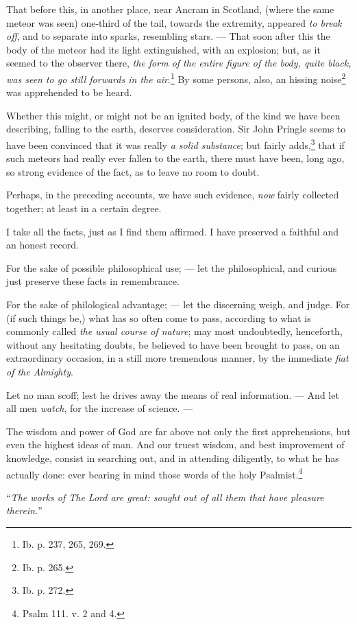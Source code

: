 \documentclass[a4paper, 12pt, oneside]{article}
\begin{document}
That before this, in another place, near Ancram in Scotland, (where the same meteor was seen) one-third of the tail, towards the extremity, appeared \emph{to break off}, and to separate into sparks, resembling stars. --- That soon after this the body of the meteor had its light extinguished, with an explosion; but, as it seemed to the observer there, \emph{the form of the entire figure of the body, quite black, was seen to go still forwards in the air}.\footnote{Ib. p. 237, 265, 269.} By some persons, also, an hissing noise\footnote{Ib. p. 265.} was apprehended to be heard.

Whether this might, or might not be an ignited body, of the kind we have been describing, falling to the earth, deserves consideration. Sir John Pringle seems to have been convinced that it was really \emph{a solid substance}; but fairly adds,\footnote{Ib. p. 272.} that if such meteors had really ever fallen to the earth, there must have been, long ago, so strong evidence of the fact, as to leave no room to doubt.

Perhaps, in the preceding accounts, we have such evidence, \emph{now} fairly collected together; at least in a certain degree.

I take all the facts, just as I find them affirmed. I have preserved a faithful and an honest record.

For the sake of possible philosophical use; --- let the philosophical, and curious just preserve these facts in remembrance.

For the sake of philological advantage; --- let the discerning weigh, and judge. For (if such things be,) what has so often come to pass, according to what is commonly called \emph{the usual course of nature}; may most undoubtedly, henceforth, without any hesitating doubts, be believed to have been brought to pass, on an extraordinary occasion, in a still more tremendous manner, by the immediate \emph{fiat of the Almighty}.

Let no man scoff; lest he drives away the means of real information. --- And let all men \emph{watch}, for the increase of science. ---

The wisdom and power of God are far above not only the first apprehensions, but even the highest ideas of man. And our truest wisdom, and best improvement of knowledge, consist in searching out, and in attending diligently, to what he has actually done: ever bearing in mind those words of the holy Psalmist.\footnote{Psalm 111. v. 2 and 4.}

``\emph{The works of The Lord are great: sought out of all them that have pleasure therein.}''
\end{document}
